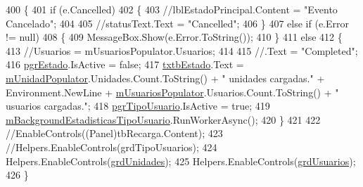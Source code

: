 \begin{DoxyCode}
400         \{
401             \textcolor{keywordflow}{if} (e.Cancelled)
402             \{
403                 \textcolor{comment}{//lblEstadoPrincipal.Content = "Evento Cancelado";}
404 
405                 \textcolor{comment}{//statusText.Text = "Cancelled";}
406             \}
407             \textcolor{keywordflow}{else} \textcolor{keywordflow}{if} (e.Error != null)
408             \{
409                 MessageBox.Show(e.Error.ToString());
410             \}
411             \textcolor{keywordflow}{else}
412             \{
413                 \textcolor{comment}{//Usuarios = mUsuariosPopulator.Usuarios;}
414 
415                 \textcolor{comment}{//.Text = "Completed";}
416                 \hyperlink{class_proyecto___integrador__3_1_1_reportes_1_1_reporte_frecuencia_de_uso_a40046fa9e14c98adb20dbc8f99f83842}{pgrEstado}.IsActive = \textcolor{keyword}{false};
417                 \hyperlink{class_proyecto___integrador__3_1_1_reportes_1_1_reporte_frecuencia_de_uso_ab5dad4dbd48cba1238ec0914d940c499}{txtbEstado}.Text = \hyperlink{class_proyecto___integrador__3_1_1_reportes_1_1_reporte_frecuencia_de_uso_a91106ba7bf23e61d729bc0399ef5fa98}{mUnidadPopulator}.Unidades.Count.ToString() + \textcolor{stringliteral}{"
       unidades cargadas."} + Environment.NewLine + \hyperlink{class_proyecto___integrador__3_1_1_reportes_1_1_reporte_frecuencia_de_uso_ad66e9ccc04488afa646ac2e65bf7db35}{mUsuariosPopulator}.Usuarios.Count.ToString() +
       \textcolor{stringliteral}{" usuarios cargadas."};
418                 \hyperlink{class_proyecto___integrador__3_1_1_reportes_1_1_reporte_frecuencia_de_uso_a6e3380fcd1c9e0e520f2867c8a98d9f0}{pgrTipoUsuario}.IsActive = \textcolor{keyword}{true};
419                 \hyperlink{class_proyecto___integrador__3_1_1_reportes_1_1_reporte_frecuencia_de_uso_a8d42c7455eb1b9669a3de163047f357f}{mBackgroundEstadisticasTipoUsuario}.RunWorkerAsync();
420             \}
421 
422             \textcolor{comment}{//EnableControls((Panel)tbRecarga.Content);}
423             \textcolor{comment}{//Helpers.EnableControls(grdTipoUsuarios);}
424             Helpers.EnableControls(\hyperlink{class_proyecto___integrador__3_1_1_reportes_1_1_reporte_frecuencia_de_uso_a0054ea7e45426e7bc4779c6d4e3144b8}{grdUnidades});
425             Helpers.EnableControls(\hyperlink{class_proyecto___integrador__3_1_1_reportes_1_1_reporte_frecuencia_de_uso_a559e1b9ac74bc2111e3d7c07400db096}{grdUsuarios});
426         \}
\end{DoxyCode}
